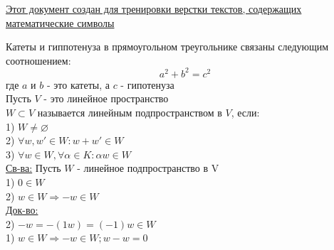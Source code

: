 \documentclass{article}
\begin{document}
\large
\begin{center}
    \underline{Этот документ создан для тренировки верстки текстов, содержащих математические символы}
\end{center}
Катеты и гиппотенуза в прямоугольном треугольнике связаны следующим соотношением:
\[ a^2 + b^2 = c^2\] где $a$ и $b$ - это катеты, а $c$ - гипотенуза\\
Пусть $V$ - это линейное пространство\\
$W \subset V$ называется линейным подпространством в $V$, если:\\

1) $W \neq \varnothing$\\
2) $\forall w, w' \in W: w + w' \in W$\\
3) $\forall w \in W, \forall \alpha \in K: \alpha w \in W$\\
\underline{Св-ва:} Пусть $W$ - линейное подпространство в V\\
1) $0 \in W$\\
2) $w \in W \Rightarrow -w \in W$\\
\underline{Док-во:}\\
2) $-w = -(1w) = (-1)w \in W$\\
1) $w \in W \Rightarrow -w \in W; w - w = 0$\\
\end{document}
